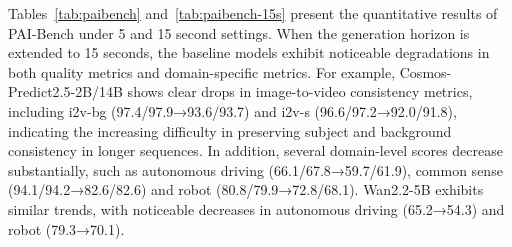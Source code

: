 \documentclass{llmxive}
\begin{document}
\begin{table}[ht]
\centering
{}
\caption{Evaluation on PAI-bench-\textbf{15s}. For each column, the highest score is \textbf{bolded}. }
\label{tab:paibench-15s}
\end{table}




Tables~\ref{tab:paibench} and~\ref{tab:paibench-15s} present the quantitative results of PAI-Bench under 5 and 15 second settings. When the generation horizon is extended to 15 seconds, the baseline models exhibit noticeable degradations in both quality metrics and domain-specific metrics. For example, Cosmos-Predict2.5-2B/14B shows clear drops in image-to-video consistency metrics, including i2v-bg (97.4/97.9→93.6/93.7) and i2v-s (96.6/97.2→92.0/91.8), indicating the increasing difficulty in preserving subject and background consistency in longer sequences. In addition, several domain-level scores decrease substantially, such as autonomous driving (66.1/67.8→59.7/61.9), common sense (94.1/94.2→82.6/82.6) and robot (80.8/79.9→72.8/68.1). Wan2.2-5B exhibits similar trends, with noticeable decreases in autonomous driving (65.2→54.3) and robot (79.3→70.1).
\end{document}
